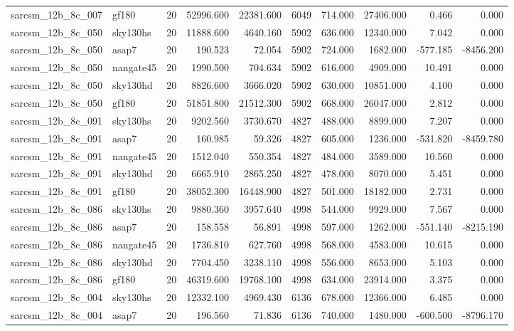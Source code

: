 \begin{longtable}{llrrrrrrrr}
sarcsm\_12b\_8c\_007 & gf180 & 20 & 52996.600 & 22381.600 & 6049 & 714.000 & 27406.000 & 0.466 & 0.000 \\
sarcsm\_12b\_8c\_050 & sky130hs & 20 & 11888.600 & 4640.160 & 5902 & 636.000 & 12340.000 & 7.042 & 0.000 \\
sarcsm\_12b\_8c\_050 & asap7 & 20 & 190.523 & 72.054 & 5902 & 724.000 & 1682.000 & -577.185 & -8456.200 \\
sarcsm\_12b\_8c\_050 & nangate45 & 20 & 1990.500 & 704.634 & 5902 & 616.000 & 4909.000 & 10.491 & 0.000 \\
sarcsm\_12b\_8c\_050 & sky130hd & 20 & 8826.600 & 3666.020 & 5902 & 630.000 & 10851.000 & 4.100 & 0.000 \\
sarcsm\_12b\_8c\_050 & gf180 & 20 & 51851.800 & 21512.300 & 5902 & 668.000 & 26047.000 & 2.812 & 0.000 \\
sarcsm\_12b\_8c\_091 & sky130hs & 20 & 9202.560 & 3730.670 & 4827 & 488.000 & 8899.000 & 7.207 & 0.000 \\
sarcsm\_12b\_8c\_091 & asap7 & 20 & 160.985 & 59.326 & 4827 & 605.000 & 1236.000 & -531.820 & -8459.780 \\
sarcsm\_12b\_8c\_091 & nangate45 & 20 & 1512.040 & 550.354 & 4827 & 484.000 & 3589.000 & 10.560 & 0.000 \\
sarcsm\_12b\_8c\_091 & sky130hd & 20 & 6665.910 & 2865.250 & 4827 & 478.000 & 8070.000 & 5.451 & 0.000 \\
sarcsm\_12b\_8c\_091 & gf180 & 20 & 38052.300 & 16448.900 & 4827 & 501.000 & 18182.000 & 2.731 & 0.000 \\
sarcsm\_12b\_8c\_086 & sky130hs & 20 & 9880.360 & 3957.640 & 4998 & 544.000 & 9929.000 & 7.567 & 0.000 \\
sarcsm\_12b\_8c\_086 & asap7 & 20 & 158.558 & 56.891 & 4998 & 597.000 & 1262.000 & -551.140 & -8215.190 \\
sarcsm\_12b\_8c\_086 & nangate45 & 20 & 1736.810 & 627.760 & 4998 & 568.000 & 4583.000 & 10.615 & 0.000 \\
sarcsm\_12b\_8c\_086 & sky130hd & 20 & 7704.450 & 3238.110 & 4998 & 556.000 & 8653.000 & 5.103 & 0.000 \\
sarcsm\_12b\_8c\_086 & gf180 & 20 & 46319.600 & 19768.100 & 4998 & 634.000 & 23914.000 & 3.375 & 0.000 \\
sarcsm\_12b\_8c\_004 & sky130hs & 20 & 12332.100 & 4969.430 & 6136 & 678.000 & 12366.000 & 6.485 & 0.000 \\
sarcsm\_12b\_8c\_004 & asap7 & 20 & 196.560 & 71.836 & 6136 & 740.000 & 1480.000 & -600.500 & -8796.170 \\

\end{longtable}

